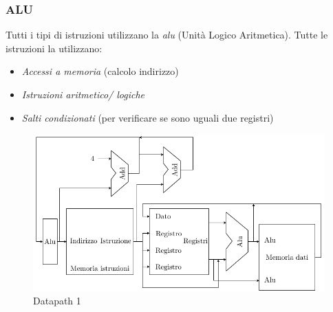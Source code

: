 \subsubsection*{ALU}
Tutti i tipi di istruzioni utilizzano la \textit{alu} (Unità Logico Aritmetica).
Tutte le istruzioni la utilizzano:
\begin{itemize}
	\item \textit{Accessi a memoria} (calcolo indirizzo)
	\item \textit{Istruzioni aritmetico/ logiche}
	\item \textit{Salti condizionati} (per verificare se sono uguali due registri)
\end{itemize}
\begin{figure}[H]
  \begin{center}
      \includegraphics{Images/Datapath1.pdf} 
  \end{center}
  \caption{Datapath 1}
\end{figure}
